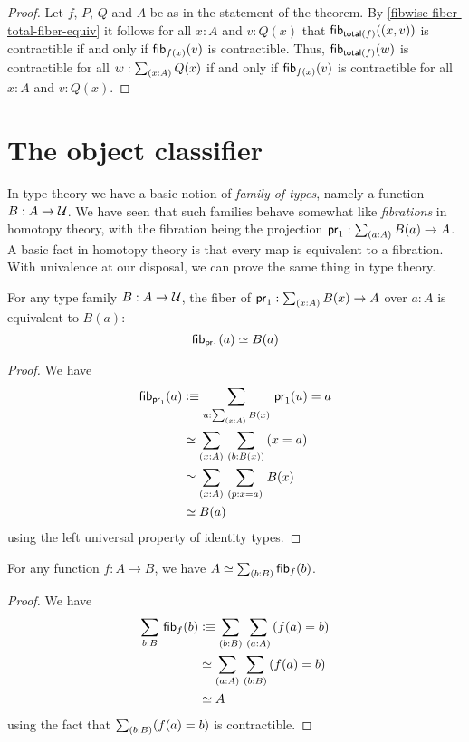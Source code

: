\begin{proof}
Let $f$, $P$, $Q$ and $A$ be as in the statement of the theorem.
By \cref{fibwise-fiber-total-fiber-equiv} it follows for all
$x:A$ and $v:Q(x)$ that
${\mathsf{fib}}_{\mathsf{total}(f)}({\mathopen{}(x,v)\mathclose{}})$ is contractible if and only if
${\mathsf{fib}}_{f(x)}(v)$ is contractible.
Thus, ${\mathsf{fib}}_{\mathsf{total}(f)}(w)$ is contractible for all $w:\sm{x:A}Q(x)$ if and only if ${\mathsf{fib}}_{f(x)}(v)$ is contractible for all $x:A$ and $v:Q(x)$.
\end{proof}

%


\section{The object classifier}
\label{sec:object-classification}

In type theory we have a basic notion of \emph{family of types}, namely a function $B:A\to\mathcal{U}$.
We have seen that such families behave somewhat like \emph{fibrations} in homotopy theory, with the fibration being the projection $\proj1:\sm{a:A} B(a) \to A$.
A basic fact in homotopy theory is that every map is equivalent to a fibration.
With univalence at our disposal, we can prove the same thing in type theory.

\begin{lem}\label{thm:fiber-of-a-fibration}
  For any type family $B:A\to\mathcal{U}$, the fiber of $\proj1:\sm{x:A} B(x) \to A$ over $a:A$ is equivalent to $B(a)$:
  \[ {\mathsf{fib}}_{\mathsf{pr}_{1}}(a) \simeq B(a) \]
\end{lem}
\begin{proof}
  We have
  \begin{align*}
    \hfib{\proj1}{a} &\defeq \sm{u:\sm{x:A} B(x)} \proj1(u)=a\\
    &\eqvsym \sm{x:A}{b:B(x)} (x=a)\\
    &\eqvsym \sm{x:A}{p:x=a} B(x)\\
    &\eqvsym B(a)
  \end{align*}
  using the left universal property of identity types.
\end{proof}

\begin{lem}\label{thm:total-space-of-the-fibers}
  For any function $f:A\to B$, we have $\eqv{A}{\sm{b:B}\hfib{f}{b}}$.
\end{lem}
\begin{proof}
  We have
  \begin{align*}
    \sm{b:B}\hfib{f}{b} &\defeq \sm{b:B}{a:A} (f(a)=b)\\
    &\eqvsym \sm{a:A}{b:B} (f(a)=b)\\
    &\eqvsym A
  \end{align*}
  using the fact that $\sm{b:B} (f(a)=b)$ is contractible.
\end{proof}

